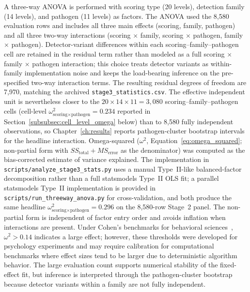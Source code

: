 A three-way ANOVA is performed with scoring type (20 levels), detection family (14 levels), and pathogen (11 levels) as factors.
The ANOVA used the 8{,}580 evaluation rows and includes all three main effects (scoring, family, pathogen) and all three two-way interactions (scoring $\times$ family, scoring $\times$ pathogen, family $\times$ pathogen). Detector-variant differences within each scoring--family--pathogen cell are retained in the residual term rather than modeled as a full scoring $\times$ family $\times$ pathogen interaction; this choice treats detector variants as within-family implementation noise and keeps the load-bearing inference on the pre-specified two-way interaction terms. The resulting residual degrees of freedom are 7{,}970, matching the archived \texttt{stage3\_statistics.csv}. The effective independent unit is nevertheless closer to the $20 \times 14 \times 11 = 3{,}080$ scoring--family--pathogen cells (cell-level $\omega^2_{\text{scoring} \times \text{pathogen}} = 0.234$ reported in Section~\ref{subsubsec:cell_level_omega} below) than to 8{,}580 fully independent observations, so Chapter~\ref{ch:results} reports pathogen-cluster bootstrap intervals for the headline interaction.
Omega-squared ($\omega^2$, Equation~\ref{eq:omega_squared}; non-partial form with $SS_{\text{total}} + MS_{\text{error}}$ as the denominator) was computed as the bias-corrected estimate of variance explained. The implementation in \texttt{scripts/analyze\_stage3\_stats.py} uses a manual Type~II-like balanced-factor decomposition rather than a full statsmodels Type~II OLS fit; a parallel statsmodels Type~II implementation is provided in \texttt{scripts/run\_threeway\_anova.py} for cross-validation, and both produce the same headline $\omega^2_{\text{scoring} \times \text{pathogen}} = 0.296$ on the 8{,}580-row Stage~2 panel. The non-partial form is independent of factor entry order and avoids inflation when interactions are present. Under Cohen's benchmarks for behavioral sciences~\cite{cohen1988statistical}, $\omega^2 > 0.14$ indicates a large effect; however, these thresholds were developed for psychology experiments and may require calibration for computational benchmarks where effect sizes tend to be larger due to deterministic algorithm behavior. The large evaluation count supports numerical stability of the fixed-effect fit, but inference is interpreted through the pathogen-cluster bootstrap because detector variants within a family are not fully independent.

